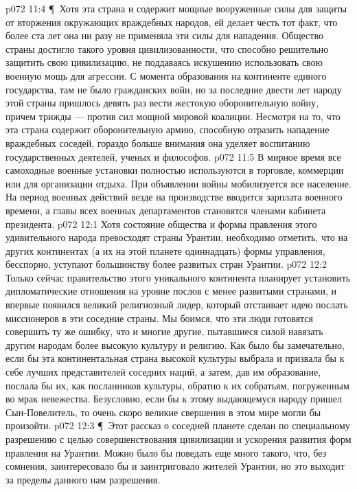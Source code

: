 \vs p072 11:4 \P\ Хотя эта страна и содержит мощные вооруженные силы для защиты от вторжения окружающих враждебных народов, ей делает честь тот факт, что более ста лет она ни разу не применяла эти силы для нападения. Общество страны достигло такого уровня цивилизованности, что способно решительно защитить свою цивилизацию, не поддаваясь искушению использовать свою военную мощь для агрессии. С момента образования на континенте единого государства, там не было гражданских войн, но за последние двести лет народу этой страны пришлось девять раз вести жестокую оборонительную войну, причем трижды --- против сил мощной мировой коалиции. Несмотря на то, что эта страна содержит оборонительную армию, способную отразить нападение враждебных соседей, гораздо больше внимания она уделяет воспитанию государственных деятелей, ученых и философов.
\vs p072 11:5 В мирное время все самоходные военные установки полностью используются в торговле, коммерции или для организации отдыха. При объявлении войны мобилизуется все население. На период военных действий везде на производстве вводится зарплата военного времени, а главы всех военных департаментов становятся членами кабинета президента.
\vs p072 12:1 Хотя состояние общества и формы правления этого удивительного народа превосходят страны Урантии, необходимо отметить, что на других континентах (а их на этой планете одиннадцать) формы управления, бесспорно, уступают большинству более развитых стран Урантии.
\vs p072 12:2 Только сейчас правительство этого уникального континента планирует установить дипломатические отношения на уровне послов с менее развитыми странами, и впервые появился великий религиозный лидер, который отстаивает идею послать миссионеров в эти соседние страны. Мы боимся, что эти люди готовятся совершить ту же ошибку, что и многие другие, пытавшиеся силой навязать другим народам более высокую культуру и религию. Как было бы замечательно, если бы эта континентальная страна высокой культуры выбрала и призвала бы к себе лучших представителей соседних наций, а затем, дав им образование, послала бы их, как посланников культуры, обратно к их собратьям, погруженным во мрак невежества. Безусловно, если бы к этому выдающемуся народу пришел Сын\hyp{}Повелитель, то очень скоро великие свершения в этом мире могли бы произойти.
\vs p072 12:3 \P\ Этот рассказ о соседней планете сделан по специальному разрешению с целью совершенствования цивилизации и ускорения развития форм правления на Урантии. Можно было бы поведать еще много такого, что, без сомнения, заинтересовало бы и заинтриговало жителей Урантии, но это выходит за пределы данного нам разрешения.
